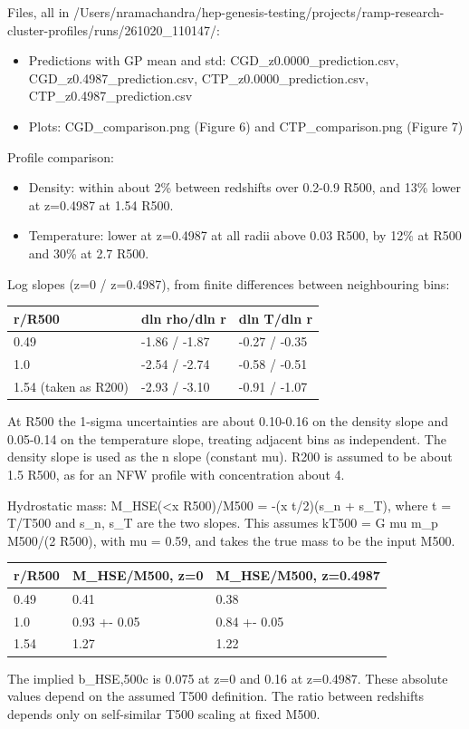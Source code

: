 \documentclass[11pt,a4paper]{article}
\begin{document}
Files, all in /Users/nramachandra/hep-genesis-testing/projects/ramp-research-cluster-profiles/runs/261020\_110147/:

\begin{itemize}
  \item Predictions with GP mean and std: CGD\_z0.0000\_prediction.csv, CGD\_z0.4987\_prediction.csv, CTP\_z0.0000\_prediction.csv, CTP\_z0.4987\_prediction.csv
  \item Plots: CGD\_comparison.png (Figure 6) and CTP\_comparison.png (Figure 7)
\end{itemize}
Profile comparison:

\begin{itemize}
  \item Density: within about 2\% between redshifts over 0.2-0.9 R500, and 13\% lower at z=0.4987 at 1.54 R500.
  \item Temperature: lower at z=0.4987 at all radii above 0.03 R500, by 12\% at R500 and 30\% at 2.7 R500.
\end{itemize}
Log slopes (z=0 / z=0.4987), from finite differences between neighbouring bins:

\begin{longtable}{@{}p{}p{}p{}@{}}
\toprule
\textbf{r/R500} & \textbf{dln rho/dln r} & \textbf{dln T/dln r} \\ \midrule \endhead
0.49 & -1.86 / -1.87 & -0.27 / -0.35 \\
1.0 & -2.54 / -2.74 & -0.58 / -0.51 \\
1.54 (taken as R200) & -2.93 / -3.10 & -0.91 / -1.07 \\
\bottomrule\end{longtable}
At R500 the 1-sigma uncertainties are about 0.10-0.16 on the density slope and 0.05-0.14 on the temperature slope, treating adjacent bins as independent. The density slope is used as the n slope (constant mu). R200 is assumed to be about 1.5 R500, as for an NFW profile with concentration about 4.

Hydrostatic mass: M\_HSE(\textless{}x R500)/M500 = -(x t/2)(s\_n + s\_T), where t = T/T500 and s\_n, s\_T are the two slopes. This assumes kT500 = G mu m\_p M500/(2 R500), with mu = 0.59, and takes the true mass to be the input M500.

\begin{longtable}{@{}p{}p{}p{}@{}}
\toprule
\textbf{r/R500} & \textbf{M\_HSE/M500, z=0} & \textbf{M\_HSE/M500, z=0.4987} \\ \midrule \endhead
0.49 & 0.41 & 0.38 \\
1.0 & 0.93 +- 0.05 & 0.84 +- 0.05 \\
1.54 & 1.27 & 1.22 \\
\bottomrule\end{longtable}
The implied b\_HSE,500c is 0.075 at z=0 and 0.16 at z=0.4987. These absolute values depend on the assumed T500 definition. The ratio between redshifts depends only on self-similar T500 scaling at fixed M500.
\end{document}
